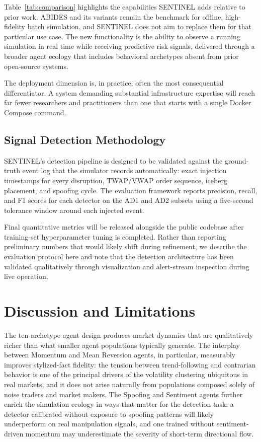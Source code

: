\documentclass[conference]{IEEEtran}
\begin{document}
Table~\ref{tab:comparison} highlights the capabilities SENTINEL adds
relative to prior work. ABIDES and its variants remain the benchmark
for offline, high-fidelity batch simulation, and SENTINEL does not aim
to replace them for that particular use case. The new functionality is
the ability to observe a running simulation in real time while
receiving predictive risk signals, delivered through a broader agent
ecology that includes behavioral archetypes absent from prior
open-source systems.

The deployment dimension is, in practice, often the most
consequential differentiator. A system demanding substantial
infrastructure expertise will reach far fewer researchers and
practitioners than one that starts with a single Docker Compose
command.

\subsection{Signal Detection Methodology}

SENTINEL's detection pipeline is designed to be validated against the
ground-truth event log that the simulator records automatically:
exact injection timestamps for every disruption, TWAP/VWAP order
sequence, iceberg placement, and spoofing cycle. The evaluation
framework reports precision, recall, and F1 scores for each detector
on the AD1 and AD2 subsets using a five-second tolerance window
around each injected event.

Final quantitative metrics will be released alongside the public
codebase after training-set hyperparameter tuning is completed.
Rather than reporting preliminary numbers that would likely shift
during refinement, we describe the evaluation protocol here and note
that the detection architecture has been validated qualitatively
through visualization and alert-stream inspection during live
operation.


\section{Discussion and Limitations}

The ten-archetype agent design produces market dynamics that are
qualitatively richer than what smaller agent populations typically
generate. The interplay between Momentum and Mean Reversion agents,
in particular, measurably improves stylized-fact fidelity: the tension
between trend-following and contrarian behavior is one of the
principal drivers of the volatility clustering ubiquitous in real
markets, and it does not arise naturally from populations composed
solely of noise traders and market makers. The Spoofing and Sentiment
agents further enrich the simulation ecology in ways that matter for
the detection task: a detector calibrated without exposure to spoofing
patterns will likely underperform on real manipulation signals, and
one trained without sentiment-driven momentum may underestimate the
severity of short-term directional flow.
\end{document}
